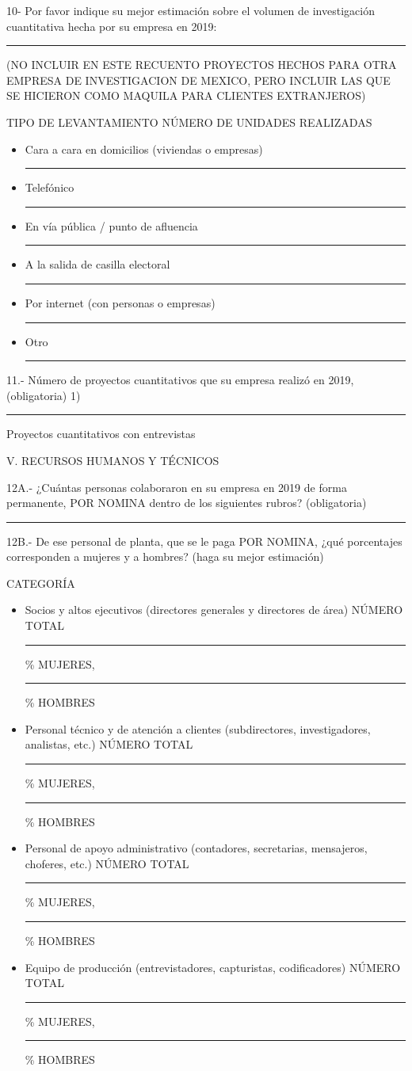 10- Por favor indique su mejor estimación sobre el volumen de investigación cuantitativa hecha por su empresa en 2019: \rule{20mm}{0.1mm} (NO INCLUIR EN ESTE RECUENTO PROYECTOS HECHOS PARA OTRA EMPRESA DE INVESTIGACION DE MEXICO, PERO INCLUIR LAS QUE SE HICIERON COMO MAQUILA PARA CLIENTES EXTRANJEROS)\newline

TIPO DE LEVANTAMIENTO\newline
NÚMERO DE UNIDADES REALIZADAS \newline

\begin{itemize}
    \item Cara a cara en domicilios (viviendas o empresas) \rule{20mm}{0.1mm}
    \item Telefónico \rule{20mm}{0.1mm}
    \item En vía pública / punto de afluencia \rule{20mm}{0.1mm}
    \item A la salida de casilla electoral \rule{20mm}{0.1mm}
    \item Por internet (con personas o empresas) \rule{20mm}{0.1mm}
    \item Otro \rule{20mm}{0.1mm}
\end{itemize}

11.- Número de proyectos cuantitativos que su empresa realizó en 2019, (obligatoria)
      1) \rule{20mm}{0.1mm}  Proyectos cuantitativos con entrevistas\newline
      
V. RECURSOS HUMANOS Y TÉCNICOS \newline

12A.- ¿Cuántas personas colaboraron en su empresa en 2019 de forma permanente, POR NOMINA dentro de los siguientes rubros? (obligatoria) \rule{20mm}{0.1mm} \newline

12B.- De ese personal de planta, que se le paga POR NOMINA, ¿qué porcentajes corresponden a mujeres y a hombres? (haga su mejor estimación)\newline

CATEGORÍA

\begin{itemize}
    \item[1)] Socios y altos ejecutivos (directores generales y directores de área) NÚMERO TOTAL \rule{20mm}{0.1mm} \% MUJERES, \rule{20mm}{0.1mm} \% HOMBRES
    \item [2)] Personal técnico y de atención a clientes (subdirectores, investigadores, analistas, etc.) NÚMERO TOTAL \rule{20mm}{0.1mm} \% MUJERES, \rule{20mm}{0.1mm} \% HOMBRES
    \item [3)] Personal de apoyo administrativo (contadores, secretarias, mensajeros, choferes, etc.) NÚMERO TOTAL \rule{20mm}{0.1mm} \% MUJERES, \rule{20mm}{0.1mm} \% HOMBRES
    \item [4)] Equipo de producción (entrevistadores, capturistas, codificadores) NÚMERO TOTAL \rule{20mm}{0.1mm} \% MUJERES, \rule{20mm}{0.1mm} \% HOMBRES
\end{itemize}
 

